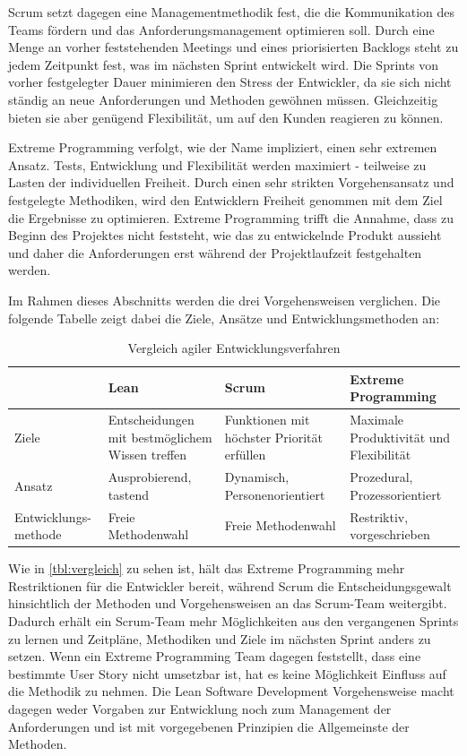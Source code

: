        Scrum setzt dagegen eine Managementmethodik fest, die die Kommunikation des Teams fördern und das Anforderungsmanagement optimieren soll. Durch eine Menge an vorher feststehenden Meetings und eines priorisierten Backlogs steht zu jedem Zeitpunkt fest, was im nächsten Sprint entwickelt wird. Die Sprints von vorher festgelegter Dauer minimieren den Stress der Entwickler, da sie sich nicht ständig an neue Anforderungen und Methoden gewöhnen müssen. Gleichzeitig bieten sie aber genügend Flexibilität, um auf den Kunden reagieren zu können.

        Extreme Programming verfolgt, wie der Name impliziert, einen sehr extremen Ansatz. Tests, Entwicklung und Flexibilität werden maximiert - teilweise zu Lasten der individuellen Freiheit. Durch einen sehr strikten Vorgehensansatz und festgelegte Methodiken, wird den Entwicklern Freiheit genommen mit dem Ziel die Ergebnisse zu optimieren. Extreme Programming trifft die Annahme, dass zu Beginn des Projektes nicht feststeht, wie das zu entwickelnde Produkt aussieht und daher die Anforderungen erst während der Projektlaufzeit festgehalten werden.

        Im Rahmen dieses Abschnitts werden die drei Vorgehensweisen verglichen. Die folgende Tabelle zeigt dabei die Ziele, Ansätze und Entwicklungsmethoden an:

        \begin{table}[H]
        \begin{tabularx}{\textwidth}{|p{2.5cm}|X|X|X|}
          \hline
            & Lean & Scrum & Extreme Programming \\
          \hline
          Ziele & Entscheidungen mit bestmöglichem Wissen treffen & Funktionen mit höchster Priorität erfüllen & Maximale Produktivität und Flexibilität
          \vspace{0.5\baselineskip} \\
          Ansatz & Ausprobierend, tastend & Dynamisch, Personenorientiert & Prozedural, Prozessorientiert
          \vspace{0.5\baselineskip} \\
          Entwicklungs-methode & Freie Methodenwahl & Freie Methodenwahl & Restriktiv, vorgeschrieben \\
          \hline
        \end{tabularx}
        \caption{Vergleich agiler Entwicklungsverfahren}
        \label{tbl:vergleich}
        \end{table}

        Wie in  \autoref{tbl:vergleich} zu sehen ist, hält das Extreme Programming mehr Restriktionen für die Entwickler bereit, während Scrum die Entscheidungsgewalt hinsichtlich der Methoden und Vorgehensweisen an das Scrum-Team weitergibt. Dadurch erhält ein Scrum-Team mehr Möglichkeiten aus den vergangenen Sprints zu lernen und Zeitpläne, Methodiken und Ziele im nächsten Sprint anders zu setzen. Wenn ein Extreme Programming Team dagegen feststellt, dass eine bestimmte User Story nicht umsetzbar ist, hat es keine Möglichkeit Einfluss auf die Methodik zu nehmen. Die Lean Software Development Vorgehensweise macht dagegen weder Vorgaben zur Entwicklung noch zum Management der Anforderungen und ist mit vorgegebenen Prinzipien die Allgemeinste der Methoden.

